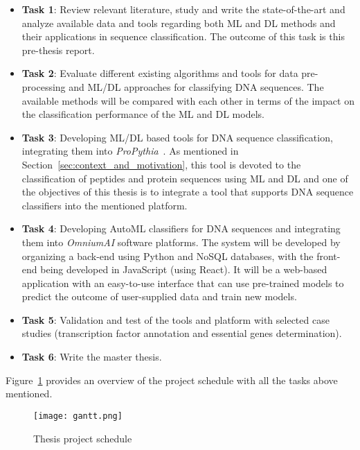 \begin{itemize}
    \item \textbf{Task 1}: Review relevant literature, study and write the state-of-the-art and analyze available data and tools regarding both \gls{ML} and \gls{DL} methods and their applications in sequence classification. The outcome of this task is this pre-thesis report.
    
    \item \textbf{Task 2}: Evaluate different existing algorithms and tools for data pre-processing and \gls{ML}/\gls{DL} approaches for classifying DNA sequences. The available methods will be compared with each other in terms of the impact on the classification performance of the \gls{ML} and \gls{DL} models.
    
    \item \textbf{Task 3}: Developing \gls{ML}/\gls{DL} based tools for DNA sequence classification, integrating them into \textit{ProPythia}~\cite{Sequeira2020ProPythia:Learning}. As mentioned in Section~\ref{sec:context_and_motivation}, this tool is devoted to the classification of peptides and protein sequences using \gls{ML} and \gls{DL} and one of the objectives of this thesis is to integrate a tool that supports \gls{DNA} sequence classifiers into the mentioned platform.
    
    \item \textbf{Task 4}: Developing \gls{AutoML} classifiers for \gls{DNA} sequences and integrating them into \textit{OmniumAI} software platforms. The system will be developed by organizing a back-end using Python and NoSQL databases, with the front-end being developed in JavaScript (using React). It will be a web-based application with an easy-to-use interface that can use pre-trained models to predict the outcome of user-supplied data and train new models.
    
    \item \textbf{Task 5}: Validation and test of the tools and platform with selected case studies (transcription factor annotation and essential genes determination). 
    
    \item \textbf{Task 6}: Write the master thesis.
    
\end{itemize}

Figure~\ref{fig:gantt} provides an overview of the project schedule with all the tasks above mentioned.

\begin{figure}[htbp]
    \centering
    \texttt{[image: gantt.png]}
    \caption{Thesis project schedule}
    \label{fig:gantt}
\end{figure}